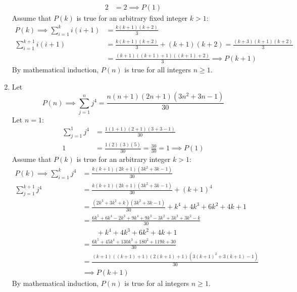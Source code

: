 \documentclass[12pt, A4]{article}
\begin{document}
\begin{enumerate}
\begin{align*}
								2 &= 2 \implies P(1)
							\end{align*}
							Assume that \(P(k)\) is true for an arbitrary fixed integer \(k > 1\):
							\begin{align*}
								P(k) \implies \sum_{i = 1}^k i(i + 1) &= \frac{k(k + 1)(k + 2)}{3} \\
								\sum_{i = 1}^{k + 1} i(i + 1) &= \frac{k(k + 1)(k + 2)}{3} + (k + 1)(k + 2)
										= \frac{(k + 3)(k + 1)(k + 2)}{3} \\
									&= \frac{(k + 1)((k + 1) + 1)((k + 1) + 2)}{3} \implies P(k + 1)
							\end{align*}
							By mathematical induction, \(P(n)\) is true for all integers \(n \ge 1\).
					\setcounter{enumi}{16}
					\item
						Let
							\[P(n) \implies \sum_{j = 1}^n j^4 = \frac{n(n + 1)(2n + 1)(3n^2 + 3n - 1)}{30}\]
							Let \(n = 1\):
							\begin{align*}
								\sum_{j = 1}^1 j^4 &= \frac{1(1 + 1)(2 + 1)(3 + 3 - 1)}{30} \\
								1 &= \frac{1(2)(3)(5)}{30}
										= \frac{30}{30} 
										= 1
										\implies P(1)
							\end{align*}
							Assume that \(P(k)\) is true for an arbitrary integer \(k > 1\):
							\begin{align*}
								P(k) \implies \sum_{i = 1}^k j^4 &= \frac{k(k + 1)(2k + 1)(3k^2 + 3k - 1)}{30} \\
								\sum_{j = 1}^{k + 1} j^4 &= \frac{k(k + 1)(2k + 1)(3k^2 + 3k - 1)}{30} + (k + 1)^4 \\
									&= \frac{(2k^3 + 3k^2 + k)(3k^2 + 3k - 1)}{30} + k^4 + 4k^3 + 6k^2 + 4k + 1 \\
									&= \frac{6k^5 + 6k^4 - 2k^3 + 9k^4 + 9k^3 - 3k^2 + 3k^3 + 3k^2 - k}{30} \\
									&\qquad + k^4 + 4k^3 + 6k^2 + 4k + 1 \\
									&= \frac{6k^5 + 45k^4 + 130k^3 + 180^2 + 119k + 30}{30} \\
									&= \frac{(k + 1)((k + 1) + 1)(2(k + 1) + 1)(3(k + 1)^2 + 3(k + 1) - 1)}{30} \\
									&\implies P(k + 1)
							\end{align*}
							By mathematical induction, \(P(n)\) is true for al integers \(n \ge 1\).
				\end{enumerate}
\end{document}
